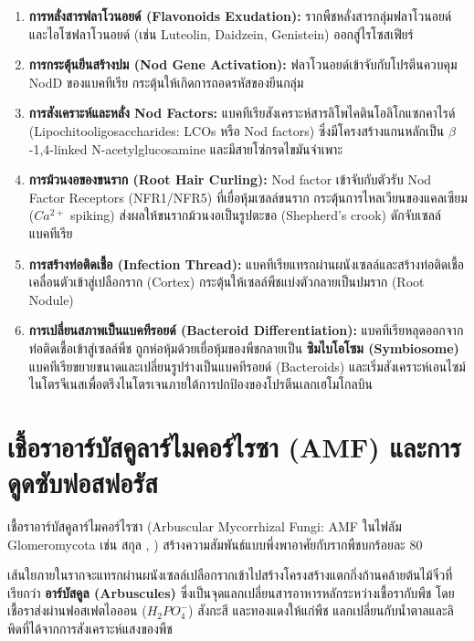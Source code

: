 \begin{enumerate}
    \item \textbf{การหลั่งสารฟลาโวนอยด์ (Flavonoids Exudation):} รากพืชหลั่งสารกลุ่มฟลาโวนอยด์และไอโซฟลาโวนอยด์ (เช่น Luteolin, Daidzein, Genistein) ออกสู่ไรโซสเฟียร์
    \item \textbf{การกระตุ้นยีนสร้างปม (Nod Gene Activation):} ฟลาโวนอยด์เข้าจับกับโปรตีนควบคุม NodD ของแบคทีเรีย กระตุ้นให้เกิดการถอดรหัสของยีนกลุ่ม 
    \item \textbf{การสังเคราะห์และหลั่ง Nod Factors:} แบคทีเรียสังเคราะห์สารลิโพไคตินโอลิโกแซกคาไรด์ (Lipochitooligosaccharides: LCOs หรือ Nod factors) ซึ่งมีโครงสร้างแกนหลักเป็น $\beta$-1,4-linked N-acetylglucosamine และมีสายโซ่กรดไขมันจำเพาะ
    \item \textbf{การม้วนงอของขนราก (Root Hair Curling):} Nod factor เข้าจับกับตัวรับ Nod Factor Receptors (NFR1/NFR5) ที่เยื่อหุ้มเซลล์ขนราก กระตุ้นการไหลเวียนของแคลเซียม ($Ca^{2+}$ spiking) ส่งผลให้ขนรากม้วนงอเป็นรูปตะขอ (Shepherd's crook) ดักจับเซลล์แบคทีเรีย
    \item \textbf{การสร้างท่อติดเชื้อ (Infection Thread):} แบคทีเรียแทรกผ่านผนังเซลล์และสร้างท่อติดเชื้อเคลื่อนตัวเข้าสู่เปลือกราก (Cortex) กระตุ้นให้เซลล์พืชแบ่งตัวกลายเป็นปมราก (Root Nodule)
    \item \textbf{การเปลี่ยนสภาพเป็นแบคทีรอยด์ (Bacteroid Differentiation):} แบคทีเรียหลุดออกจากท่อติดเชื้อเข้าสู่เซลล์พืช ถูกห่อหุ้มด้วยเยื่อหุ้มของพืชกลายเป็น \textbf{ซิมไบโอโซม (Symbiosome)} แบคทีเรียขยายขนาดและเปลี่ยนรูปร่างเป็นแบคทีรอยด์ (Bacteroids) และเริ่มสังเคราะห์เอนไซม์ไนโตรจีเนสเพื่อตรึงไนโตรเจนภายใต้การปกป้องของโปรตีนเลกเฮโมโกลบิน
\end{enumerate}

\section{เชื้อราอาร์บัสคูลาร์ไมคอร์ไรซา (AMF) และการดูดซับฟอสฟอรัส}

เชื้อราอาร์บัสคูลาร์ไมคอร์ไรซา (Arbuscular Mycorrhizal Fungi: AMF ในไฟลัม Glomeromycota เช่น สกุล , ) สร้างความสัมพันธ์แบบพึ่งพาอาศัยกับรากพืชบกร้อยละ 80 

เส้นใยภายในรากจะแทรกผ่านผนังเซลล์เปลือกรากเข้าไปสร้างโครงสร้างแตกกิ่งก้านคล้ายต้นไม้จิ๋วที่เรียกว่า \textbf{อาร์บัสคูล (Arbuscules)} ซึ่งเป็นจุดแลกเปลี่ยนสารอาหารหลักระหว่างเชื้อรากับพืช โดยเชื้อราส่งผ่านฟอสเฟตไอออน ($H_2PO_4^-$) สังกะสี และทองแดงให้แก่พืช แลกเปลี่ยนกับน้ำตาลและลิพิดที่ได้จากการสังเคราะห์แสงของพืช

